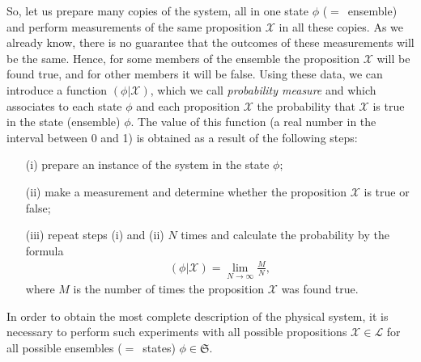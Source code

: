 \documentclass[nochecklpage]{stefan1}
\theoremstyle{definition}
\begin{document}
So, let us prepare many copies of the system, all in one state
$\phi $ ($=$~ensemble) and perform measurements of the same proposition
$ \mathcal{X} $ in all these copies. As we already know, there is no
guarantee that the outcomes of these measurements will be the same.
Hence, for some members of the ensemble the proposition $ \mathcal{X}
$ will be found true, and for other members it will be false. Using
these data, we can introduce a function $ (\phi | \mathcal{X}) $, which
we call \emph{probability measure} and which
associates to each state $ \phi $ and each proposition $ \mathcal{X} $
the probability that $ \mathcal{X} $ is true in the state (ensemble)
$ \phi $. The value of this function (a real number in the interval
between 0 and 1) is obtained as a result of the following steps:
%
\begin{enumerate}
\item[(i)] prepare an instance of the system in the state $\phi $;
\item[(ii)] make a measurement and determine whether the proposition
$\mathcal{X}$ is true or false;
\item[(iii)] repeat steps (i) and (ii) $N$ times and calculate the
probability by the formula
%
\begin{align*}
(\phi |\mathcal{X}) = \lim_{N \to \infty } \frac{M}{N},
\end{align*}
%
where $M$ is the number of times the proposition $\mathcal{X}$ was found
true.
\end{enumerate}
%
In order to obtain the most complete description of the physical system,
it is necessary to perform such experiments with all possible
propositions $ \mathcal{X} \in \mathcal{L} $ for all possible ensembles
($=$~states) $ \phi \in \mathfrak{S} $.

\end{document}
